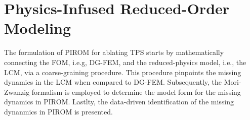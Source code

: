 \section{Physics-Infused Reduced-Order Modeling}\label{sec_pirom}

The formulation of PIROM for ablating TPS starts by mathematically connecting the FOM, i.e.g, DG-FEM, and the reduced-physics model, i.e., the LCM, via a coarse-graining procedure. This procedure pinpoints the missing dynamics in the LCM when compared to DG-FEM. Subsequently, the Mori-Zwanzig formalism is employed to determine the model form for the missing dynamics in PIROM. Lastlty, the data-driven identification of the missing dynanmics in PIROM is presented.

